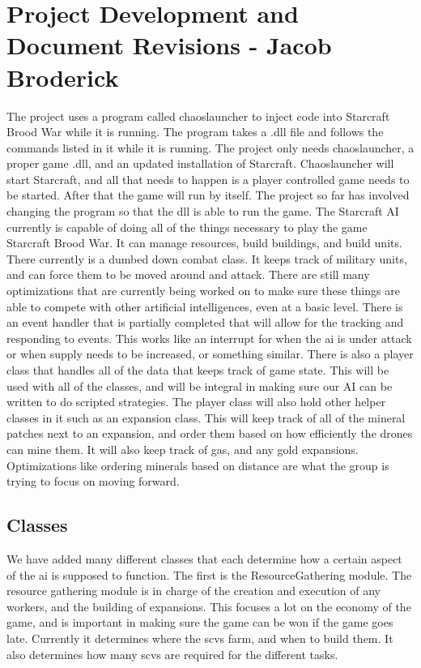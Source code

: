 \documentclass[10pt,letterpaper,onecolumn,draftclsnofoot]{IEEEtran}
\begin{document}
	\section{Project Development and Document Revisions - Jacob Broderick}
	The project uses a program called chaoslauncher to inject code into Starcraft Brood War while it is running. The program takes a .dll file and follows the commands listed in it while it is running. The project only needs chaoslauncher, a proper game .dll, and an updated installation of Starcraft. Chaoslauncher will start Starcraft, and all that needs to happen is a player controlled game needs to be started. After that the game will run by itself. The project so far has involved changing the program so that the dll is able to run the game. The Starcraft AI currently is capable of doing all of the things necessary to play the game Starcraft Brood War. It can manage resources, build buildings, and build units. There currently is a dumbed down combat class. It keeps track of military units, and can force them to be moved around and attack. There are still many optimizations that are currently being worked on to make sure these things are able to compete with other artificial intelligences, even at a basic level. There is an event handler that is partially completed that will allow for the tracking and responding to events. This works like an interrupt for when the ai is under attack or when supply needs to be increased, or something similar. There is also a player class that handles all of the data that keeps track of game state. This will be used with all of the classes, and will be integral in making sure our AI can be written to do scripted strategies. The player class will also hold other helper classes in it such as an expansion class. This will keep track of all of the mineral patches next to an expansion, and order them based on how efficiently the drones can mine them. It will also keep track of gas, and any gold expansions. Optimizations like ordering minerals based on distance are what the group is trying to focus on moving forward. 
	
	\subsection{Classes}
	We have added many different classes that each determine how a certain aspect of the ai is supposed to function. The first is the ResourceGathering module. The resource gathering module is in charge of the creation and execution of any workers, and the building of expansions. This focuses a lot on the economy of the game, and is important in making sure the game can be won if the game goes late. Currently it determines where the scvs farm, and when to build them. It also determines how many scvs are required for the different tasks.  
	
\end{document}
